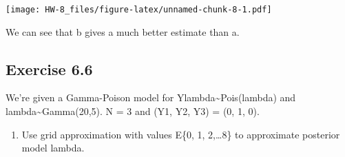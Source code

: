 \documentclass[
]{article}
\providecommand{\tightlist}{%
  \setlength{\itemsep}{0pt}\setlength{\parskip}{0pt}}
\begin{document}
\texttt{[image: HW-8\_files/figure-latex/unnamed-chunk-8-1.pdf]}

We can see that b gives a much better estimate than a.

\hypertarget{exercise-6.6}{%
\subsection{Exercise 6.6}\label{exercise-6.6}}

We're given a Gamma-Poison model for
Y\textbar lambda\textasciitilde Pois(lambda) and
lambda\textasciitilde Gamma(20,5). N = 3 and (Y1, Y2, Y3) = (0, 1, 0).

\begin{enumerate}
\def\labelenumi{\alph{enumi})}
\tightlist
\item
  Use grid approximation with values E\{0, 1, 2,\ldots8\} to approximate
  posterior model lambda.
\end{enumerate}
\end{document}

